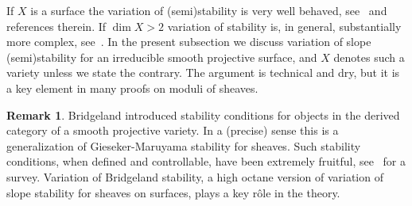 \documentclass[11pt]{amsart}
\theoremstyle{definition}
\newtheorem{rmk}[lmm]{Remark}
\theoremstyle{remark}
\begin{document}
%
 If $X$ is a surface the variation of (semi)stability is very well behaved, see~\cite{huy-lehn:librofasci} and  references therein. If $\dim X>2$  variation of stability is, in general, substantially more complex, see~\cite{grebrosstoma:fibvettaltadim}. 
   In the present subsection we discuss variation  of slope (semi)stability for 
 an irreducible smooth projective surface, and $X$ denotes such a variety   unless we state the contrary. The argument is technical and dry, but it is a key element in many proofs on moduli of sheaves.
%
\begin{rmk}
%
 Bridgeland introduced stability conditions for objects in the derived category of a smooth projective variety. In a (precise) sense this is  a generalization of Gieseker-Maruyama stability for sheaves. 
 Such stability conditions, when  defined  and controllable, have been extremely fruitful, see~\cite{bayermacri:icm} for a survey.  Variation of Bridgeland stability,  a high octane version of variation of slope stability for sheaves on surfaces,    plays a key r\^ole in the theory. 
%
\end{rmk}
%
%
\end{document}

